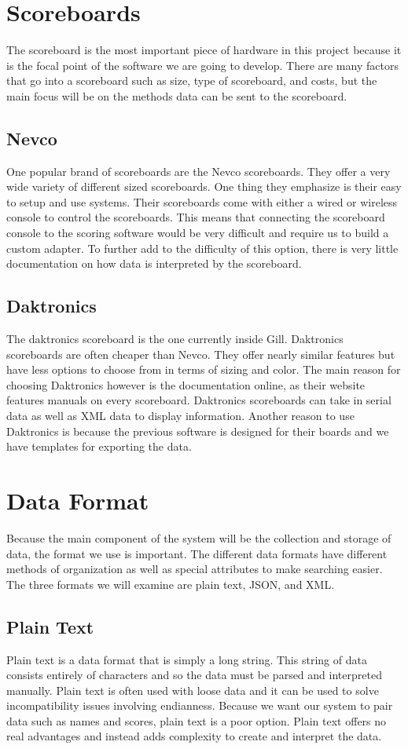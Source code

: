 \documentclass[letterpaper,10pt,draftclsnofoot,onecolumn,]{article}
\begin{document}
\section{Scoreboards}
The scoreboard is the most important piece of hardware in this project because it is the focal point of the software we are going to develop. There are many factors that go into a scoreboard such as size, type of scoreboard, and costs, but the main focus will be on the methods data can be sent to the scoreboard.
\subsection*{Nevco}
One popular brand of scoreboards are the Nevco scoreboards. They offer a very wide variety of different sized scoreboards. One thing they emphasize is their easy to setup and use systems. Their scoreboards come with either a wired or wireless console to control the scoreboards. This means that connecting the scoreboard console to the scoring software would be very difficult and require us to build a custom adapter. To further add to the difficulty of this option, there is very little documentation on how data is interpreted by the scoreboard.
\subsection*{Daktronics}
The daktronics scoreboard is the one currently inside Gill. Daktronics scoreboards are often cheaper than Nevco. They offer nearly similar features but have less options to choose from in terms of sizing and color. The main reason for choosing Daktronics however is the documentation online, as their website features manuals on every scoreboard. Daktronics scoreboards can take in serial data as well as XML data to display information. Another reason to use Daktronics is because the previous software is designed for their boards and we have templates for exporting the data.

\section{Data Format}
Because the main component of the system will be the collection and storage of data, the format we use is important.  The different data formats have different methods of organization as well as special attributes to make searching easier. The three formats we will examine are plain text, JSON, and XML.
\subsection*{Plain Text}
Plain text is a data format that is simply a long string. This string of data consists entirely of characters and so the data must be parsed and interpreted manually. Plain text is often used with loose data and it can be used to solve incompatibility issues involving endianness. Because we want our system to pair data such as names and scores, plain text is a poor option. Plain text offers no real advantages and instead adds complexity to create and interpret the data.
\end{document}

